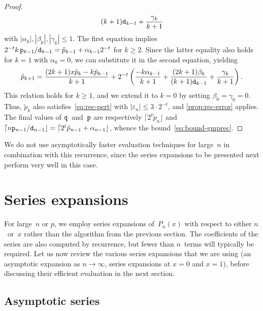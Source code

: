 \documentclass[nohypdvips,review]{siamart0216}
\begin{document}
\begin{proof}
\begin{align*}
          { (k+1) \mathtt d_{k-1} }
     + \frac{\gamma_k}{k+1}
\end{align*}
with $|\alpha_k|, |\beta_k|, |\gamma_k| \leq 1$.
The first equation implies
$2^{-t} k \, \mathtt p_{k-1}/\mathtt d_{k-1} = \tilde p_{k-1} + \alpha_{k-1} 2^{-t}$
for $k \geq 2$.
Since the latter equality also holds for $k = 1$ with $\alpha_0 = 0$, we can
substitute it in the second equation, yielding
\[
  \tilde p_{k+1}
  = \frac{ (2k+1) x \tilde p_k - k \tilde p_{k-1} }{k+1}
     + 2^{-t} \left(
          \frac{-k \alpha_{k-1}}{k+1}
        + \frac{(2k + 1) \beta_k}{(k+1) \mathtt d_{k-1}}
        + \frac{\gamma_k}{k+1}
       \right).
\]
This relation holds for $k \geq 1$, and we extend it to $k=0$ by setting
$\beta_0 = \gamma_0 = 0$.
Thus, $\tilde p_k$ also satisfies~\cref{eq:rec-pert} with
$|\varepsilon_n| \leq 3 \cdot 2^{-t}$, and \cref{prop:rec-error} applies.
The final values of $\mathtt q$~and~$\mathtt p$ are respectively
$\lceil 2^t \tilde p_n \rfloor$
and
$\lceil n \mathtt p_{n-1}/\mathtt d_{n-1} \rfloor
= \lceil 2^t \tilde p_{n-1} + \alpha_{n-1} \rfloor$,
whence the bound~\cref{eq:bound-gmprec}.
\end{proof}

We do not use asymptotically faster evaluation techniques for large~$n$ in
combination with this recurrence, since the series expansions to be
presented next perform very well in this case.

\section{Series expansions}

\label{sec:series}

For large $n$ or $p$, we employ series expansions of $P_n(x)$ with
respect to either $n$ or $x$ rather than the algorithm from the
previous section.
The coefficients of the series are also computed by recurrence,
but fewer than $n$ terms will typically be required.
Let us now review the various series expansions that we are using (an
asymptotic expansion as $n \to \infty$, series expansions at $x=0$
and $x=1$), before discussing their efficient evaluation in the next
section.

\subsection{Asymptotic series}

\label{sec:series-asy}
\end{document}
